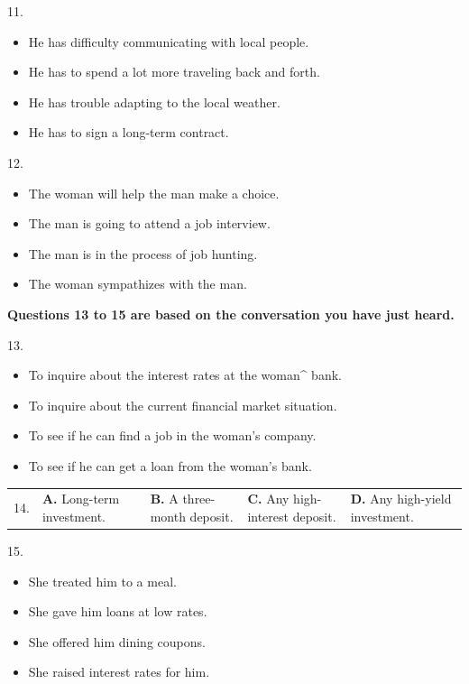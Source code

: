 \documentclass[UTF8,11pt]{ctexart}
\begin{document}
11.


\begin{itemize}[leftmargin=2em,itemsep=.2em,topsep=.4em]\item[A.] He has difficulty communicating with local people.
\item[B.] He has to spend a lot more traveling back and forth.
\item[C.] He has trouble adapting to the local weather.
\item[D.] He has to sign a long-term contract.
\end{itemize}

12.


\begin{itemize}[leftmargin=2em,itemsep=.2em,topsep=.4em]\item[A.] The woman will help the man make a choice.
\item[B.] The man is going to attend a job interview.
\item[C.] The man is in the process of job hunting.
\item[D.] The woman sympathizes with the man.
\end{itemize}

\textbf{Questions 13 to 15 are based on the conversation you have just heard.}


13.


\begin{itemize}[leftmargin=2em,itemsep=.2em,topsep=.4em]\item[A.] To inquire about the interest rates at the woman\textasciicircum{} bank.
\item[B.] To inquire about the current financial market situation.
\item[C.] To see if he can find a job in the woman’s company.
\item[D.] To see if he can get a loan from the woman’s bank.
\end{itemize}

\noindent\begin{tabularx}{\linewidth}{@{}lXXXX@{}}14. & \textbf{A.} Long-term investment. & \textbf{B.} A three-month deposit. & \textbf{C.} Any high-interest deposit. & \textbf{D.} Any high-yield investment.\\\end{tabularx}\par

15.


\begin{itemize}[leftmargin=2em,itemsep=.2em,topsep=.4em]\item[A.] She treated him to a meal.
\item[B.] She gave him loans at low rates.
\item[C.] She offered him dining coupons.
\item[D.] She raised interest rates for him.
\end{itemize}
\end{document}
